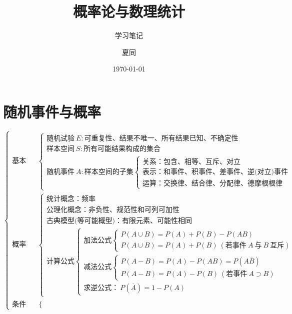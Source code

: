 \documentclass[lang=cn,11pt]{elegantbook}
\title{概率论与数理统计}
\subtitle{学习笔记}
\author{夏同}
\institute{华南理工大学}
\date{\today}
\begin{document}
\maketitle
\frontmatter

\tableofcontents

\mainmatter

\chapter{随机事件与概率}
\[
\begin{cases}
\text{基本概念} & 
\begin{cases}
\text{随机试验} \ E: \text{可重复性、结果不唯一、所有结果已知、不确定性} \\
\text{样本空间} \ S: \text{所有可能结果构成的集合} \\
\text{随机事件} \ A: \text{样本空间的子集} 
\begin{cases}
\text{关系：包含、相等、互斥、对立} \\
\text{表示：和事件、积事件、差事件、逆(对立)事件} \\
\text{运算：交换律、结合律、分配律、德摩根根律}
\end{cases}
\end{cases} \\
\text{概率概念} & 
\begin{cases}
\text{统计概念：频率} \\
\text{公理化概念：非负性、规范性和可列可加性} \\
\text{古典模型(等可能概型)：有限元素、可能性相同} \\
\text{计算公式}
\begin{cases}
\text{加法公式}
\begin{cases}
P(A \cup B) = P(A) + P(B) - P(AB) \\
P(A \cup B) = P(A) + P(B) \ (\text{若事件} \ A \ \text{与} \ B \ \text{互斥})
\end{cases} \\
\text{减法公式}
\begin{cases}
P(A - B) = P(A) - P(AB) = P(A\overline{B}) \\
P(A - B) = P(A) - P(B) \ (\text{若事件} \ A \supset B)
\end{cases} \\
\text{求逆公式：} \ P(\overline{A}) = 1 - P(A)
\end{cases}
\end{cases} \\
\text{条件概率概念} & 
\begin{cases}

\end{cases}
\end{cases}\]
\end{document}
